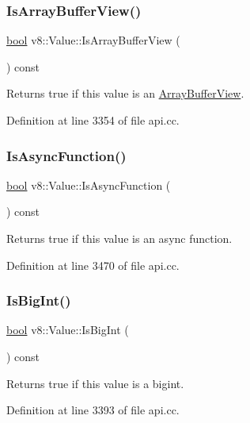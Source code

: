 \subsubsection{\texorpdfstring{Is\+Array\+Buffer\+View()}{IsArrayBufferView()}}
{\footnotesize\ttfamily \mbox{\hyperlink{classbool}{bool}} v8\+::\+Value\+::\+Is\+Array\+Buffer\+View (\begin{DoxyParamCaption}{ }\end{DoxyParamCaption}) const}

Returns true if this value is an \mbox{\hyperlink{classv8_1_1ArrayBufferView}{Array\+Buffer\+View}}. 

Definition at line 3354 of file api.\+cc.

\mbox{\label{classv8_1_1Value_ade5685814ab387c1772e2d5dbd000735}} 
\subsubsection{\texorpdfstring{Is\+Async\+Function()}{IsAsyncFunction()}}
{\footnotesize\ttfamily \mbox{\hyperlink{classbool}{bool}} v8\+::\+Value\+::\+Is\+Async\+Function (\begin{DoxyParamCaption}{ }\end{DoxyParamCaption}) const}

Returns true if this value is an async function. 

Definition at line 3470 of file api.\+cc.

\mbox{\label{classv8_1_1Value_a19fe27cd498d16f014b6f40038ff96ef}} 
\subsubsection{\texorpdfstring{Is\+Big\+Int()}{IsBigInt()}}
{\footnotesize\ttfamily \mbox{\hyperlink{classbool}{bool}} v8\+::\+Value\+::\+Is\+Big\+Int (\begin{DoxyParamCaption}{ }\end{DoxyParamCaption}) const}

Returns true if this value is a bigint. 

Definition at line 3393 of file api.\+cc.

